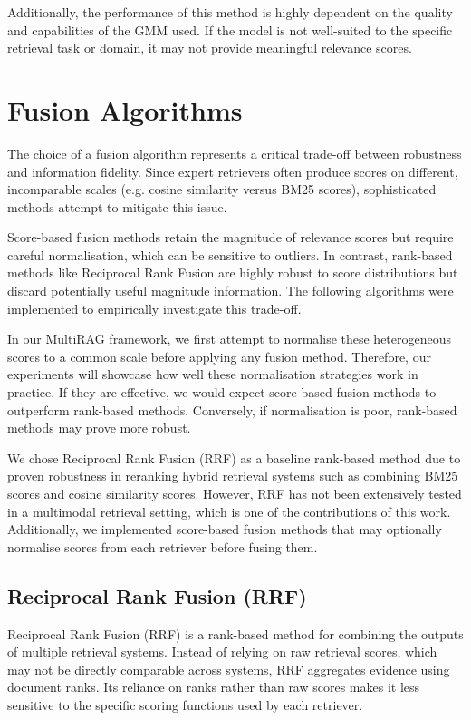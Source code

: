 \documentclass[12pt,twoside]{report}
\begin{document}
Additionally, the performance of this method is highly dependent on the quality and capabilities of the GMM used. If the model is not well-suited to the specific retrieval task or domain, it may not provide meaningful relevance scores.

\section{Fusion Algorithms}

The choice of a fusion algorithm represents a critical trade-off between robustness and information fidelity. Since expert retrievers often produce scores on different, incomparable scales (e.g. cosine similarity versus BM25 scores), sophisticated methods attempt to mitigate this issue.

Score-based fusion methods retain the magnitude of relevance scores but require careful normalisation, which can be sensitive to outliers. In contrast, rank-based methods like Reciprocal Rank Fusion are highly robust to score distributions but discard potentially useful magnitude information. The following algorithms were implemented to empirically investigate this trade-off.

In our MultiRAG framework, we first attempt to normalise these heterogeneous scores to a common scale before applying any fusion method. Therefore, our experiments will showcase how well these normalisation strategies work in practice. If they are effective, we would expect score-based fusion methods to outperform rank-based methods. Conversely, if normalisation is poor, rank-based methods may prove more robust.

We chose Reciprocal Rank Fusion (RRF) as a baseline rank-based method due to proven robustness in reranking hybrid retrieval systems such as combining BM25 scores and cosine similarity scores. However, RRF has not been extensively tested in a multimodal retrieval setting, which is one of the contributions of this work. Additionally, we implemented score-based fusion methods that may optionally normalise scores from each retriever before fusing them.

\subsection{Reciprocal Rank Fusion (RRF)}

Reciprocal Rank Fusion (RRF)\cite{RRFExplained} is a rank-based method for combining the outputs of multiple retrieval systems. 
Instead of relying on raw retrieval scores, which may not be directly comparable across systems, RRF aggregates evidence using document ranks. Its reliance on ranks rather than raw scores makes it less sensitive to the specific scoring functions used by each retriever.
\end{document}
